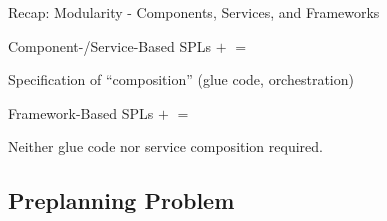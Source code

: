 \begin{frame}{Recap: Modularity - Components, Services, and Frameworks} %
	\begin{mycolumns}[widths={40,60},animation=none]
		\begin{example}{Component-/Service-Based SPLs} %
				\vspace*{\fill}
					$+$ 
				\vspace*{\fill}	
				\vspace*{\fill}
					$=$ 
				\vspace*{\fill}	
		\end{example}	
		\begin{example}{Specification of ``composition'' (glue code, orchestration)}
			\centering
		\end{example}
	\mynextcolumn		
		\begin{example}{Framework-Based SPLs}
				\vspace*{\fill}
					$+$ 
				\vspace*{\fill}	
				\vspace*{\fill}
					$=$ 
				\vspace*{\fill}	
		\end{example}
		\begin{note}{}
			Neither glue code nor service composition required.
		\end{note}			
	\end{mycolumns}	
\end{frame}



\subsection{Preplanning Problem}


